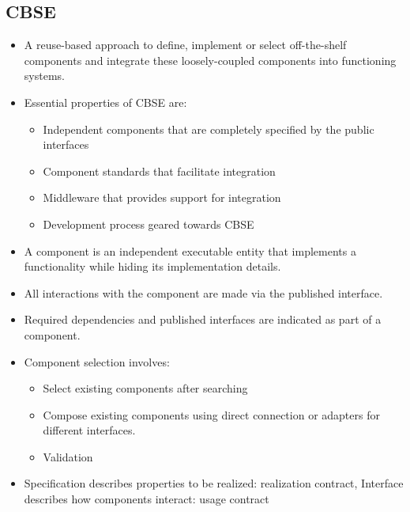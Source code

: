 \documentclass{article}
\begin{document}
\subsection{CBSE}
\begin{itemize}
    \item A reuse-based approach to define, implement or select off-the-shelf components and integrate these loosely-coupled components into functioning systems. 
    
    \item Essential properties of CBSE are:
    \begin{itemize}
        \item Independent components that are completely specified by the public interfaces 
        
        \item Component standards that facilitate integration
        
        \item Middleware that provides support for integration
        
        \item Development process geared towards CBSE
    \end{itemize}
    
    \item A component is an independent executable entity that implements a functionality while hiding its implementation details.
    
    \item All interactions with the component are made via the published interface. 
    
    \item Required dependencies and published interfaces are indicated as part of a component. 
    
    \item Component selection involves:
    \begin{itemize}
        \item Select existing components after searching
        
        \item Compose existing components using direct connection or adapters for different interfaces. 
        
        \item Validation
    \end{itemize}
    
    \item Specification describes properties to be realized: realization contract,  Interface describes how components interact: usage contract


\end{itemize}
\end{document}
